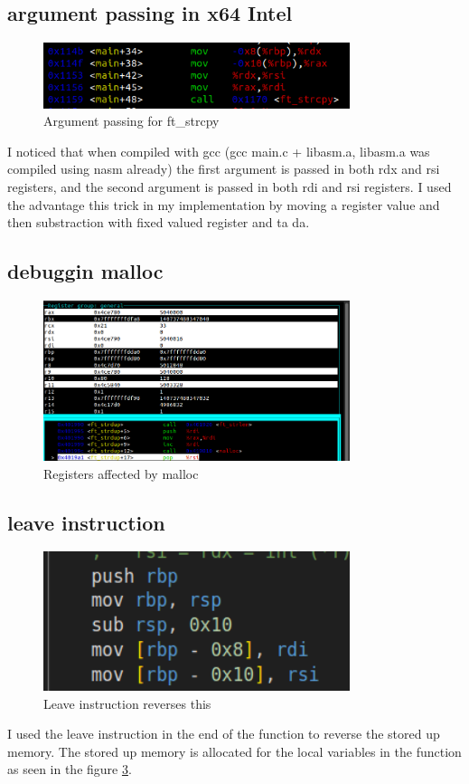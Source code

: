 \documentclass{article}
\begin{document}
\subsection{argument passing in x64 Intel}
\begin{figure}[H]
    \centering
    \includegraphics[width=0.8\textwidth]{trick.png}
    \caption{Argument passing for ft\_strcpy}
    \label{fig:trick}
\end{figure}

I noticed that when compiled with gcc (gcc main.c + libasm.a, libasm.a was compiled using nasm already) the first argument is passed in both rdx and rsi registers, and the second argument is passed in both rdi and rsi registers. I used the advantage this trick in my implementation by moving a register value and then substraction with fixed valued register and ta da.

\subsection{debuggin malloc}
\begin{figure}[H]
    \centering
    \includegraphics[width=0.8\textwidth]{regs_after_malloc.png}
    \caption{Registers affected by malloc}
    \label{fig:reg_malloc}
\end{figure}

\subsection{leave instruction}
\begin{figure}[H]
    \centering
    \includegraphics[width=0.8\textwidth]{leave.png}
    \caption{Leave instruction reverses this}
    \label{fig:leave}
\end{figure}

I used the leave instruction in the end of the function to reverse the stored up memory. The stored up memory is allocated for the local variables in the function as seen in the figure \ref{fig:leave}.
\end{document}
